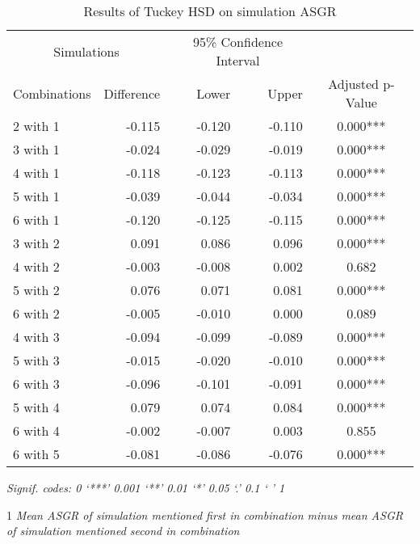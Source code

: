 \documentclass[12pt, a4paper]{article}
\begin{document}
\newpage

\begin{table}[h]
    \centering
    \begin{threeparttable}
        \caption{Results of Tuckey HSD on simulation ASGR}
        \label{table:asgrTukeyHSD}
        \begin{tabular}{lrrrc}
          \toprule
          \multicolumn{2}{c}{Simulations} & \multicolumn{2}{c}{95\% Confidence Interval} &  \\
          \cmidrule(lr){1-2} \cmidrule(lr){3-4}
          Combinations & Difference\tnote{1} & Lower & Upper & Adjusted p-Value \\ 
          \midrule
          2 with 1 & -0.115 & -0.120 & -0.110 & 0.000*** \\ 
          3 with 1 & -0.024 & -0.029 & -0.019 & 0.000*** \\ 
          4 with 1 & -0.118 & -0.123 & -0.113 & 0.000*** \\ 
          5 with 1 & -0.039 & -0.044 & -0.034 & 0.000*** \\ 
          6 with 1 & -0.120 & -0.125 & -0.115 & 0.000*** \\ 
          3 with 2 & 0.091 & 0.086 & 0.096 & 0.000*** \\ 
          4 with 2 & -0.003 & -0.008 & 0.002 & 0.682 \\ 
          5 with 2 & 0.076 & 0.071 & 0.081 & 0.000*** \\ 
          6 with 2 & -0.005 & -0.010 & 0.000 & 0.089 \\ 
          4 with 3 & -0.094 & -0.099 & -0.089 & 0.000*** \\ 
          5 with 3 & -0.015 & -0.020 & -0.010 & 0.000*** \\ 
          6 with 3 & -0.096 & -0.101 & -0.091 & 0.000*** \\ 
          5 with 4 & 0.079 & 0.074 & 0.084 & 0.000*** \\ 
          6 with 4 & -0.002 & -0.007 & 0.003 & 0.855 \\ 
          6 with 5 & -0.081 & -0.086 & -0.076 & 0.000*** \\ 
          \bottomrule
        \end{tabular}
        \begin{tablenotes}[flushleft]
            \footnotesize
            \item \textit{Signif. codes:  0 ‘***’ 0.001 ‘**’ 0.01 ‘*’ 0.05 ‘.’ 0.1 ‘ ’ 1}
            \item[1] \textit{Mean ASGR of simulation mentioned first in combination minus mean ASGR of simulation mentioned second in combination}
        \end{tablenotes}
    \end{threeparttable}
\end{table}
\vspace{0.5 cm}
\end{document}

